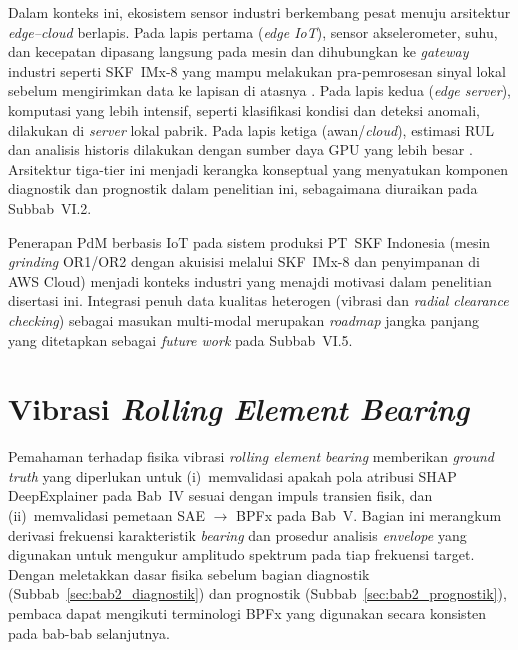 Dalam konteks ini, ekosistem sensor industri berkembang pesat menuju
arsitektur \emph{edge--cloud} berlapis. Pada lapis pertama (\emph{edge IoT}),
sensor akselerometer, suhu, dan kecepatan dipasang langsung pada mesin dan
dihubungkan ke \emph{gateway} industri seperti SKF~IMx-8 yang mampu melakukan
pra-pemrosesan sinyal lokal sebelum mengirimkan data ke lapisan di atasnya
. Pada lapis kedua (\emph{edge server}), komputasi
yang lebih intensif, seperti klasifikasi kondisi dan deteksi anomali, dilakukan di
\emph{server} lokal pabrik. Pada lapis ketiga (awan/\emph{cloud}), estimasi
RUL dan analisis historis dilakukan dengan sumber daya GPU yang lebih besar
. Arsitektur tiga-tier ini menjadi kerangka
konseptual yang menyatukan komponen diagnostik dan prognostik dalam penelitian
ini, sebagaimana diuraikan pada Subbab~VI.2.

Penerapan PdM berbasis IoT pada sistem produksi PT~SKF Indonesia (mesin
\emph{grinding} OR1/OR2 dengan akuisisi melalui SKF~IMx-8 dan penyimpanan di
AWS Cloud) menjadi konteks industri yang menajdi motivasi dalam penelitian disertasi ini. Integrasi
penuh data kualitas heterogen (vibrasi dan \emph{radial clearance checking})
sebagai masukan multi-modal merupakan \emph{roadmap} jangka panjang yang
ditetapkan sebagai \emph{future work} pada Subbab~VI.5.

{\color{blue}\section{Vibrasi \emph{Rolling Element Bearing}}
\label{sec:bab2_fisika_vibrasi}}

{\color{blue}Pemahaman terhadap fisika vibrasi \emph{rolling element bearing} memberikan \emph{ground
truth} yang diperlukan untuk (i)~memvalidasi apakah pola atribusi SHAP DeepExplainer
pada Bab~IV sesuai dengan impuls transien fisik, dan (ii)~memvalidasi pemetaan
SAE $\to$ BPFx pada Bab~V.
Bagian ini merangkum derivasi frekuensi karakteristik \emph{bearing} dan prosedur
analisis \emph{envelope} yang digunakan untuk mengukur amplitudo spektrum pada
tiap frekuensi target.
Dengan meletakkan dasar fisika sebelum bagian diagnostik (Subbab~\ref{sec:bab2_diagnostik})
dan prognostik (Subbab~\ref{sec:bab2_prognostik}), pembaca dapat mengikuti terminologi
BPFx yang digunakan secara konsisten pada bab-bab selanjutnya.}

